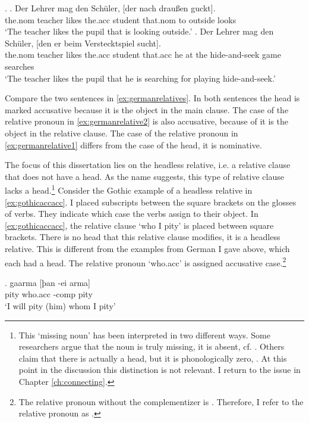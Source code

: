 \ex.\label{ex:germanrelatives}
\ag. Der Lehrer mag den Schüler, [der nach draußen guckt].\\
 the.\ac{nom} teacher likes the.\ac{acc} student that.\ac{nom} to outside looks\\
 `The teacher likes the pupil that is looking outside.'\label{ex:germanrelative1}
 \bg. Der Lehrer mag den Schüler, [den er beim Verstecktspiel sucht].\\
 the.\ac{nom} teacher likes the.\ac{acc} student that.\ac{acc} he {at the} {hide-and-seek game} searches\\
 `The teacher likes the pupil that he is searching for playing hide-and-seek.'\label{ex:germanrelative2}

Compare the two sentences in \ref{ex:germanrelatives}. In both sentences the head is marked accusative because it is the object in the main clause. The case of the relative pronoun in \ref{ex:germanrelative2} is also accusative, because of it is the object in the relative clause. The case of the relative pronoun in \ref{ex:germanrelative1} differs from the case of the head, it is nominative.


The focus of this dissertation lies on the headless relative, i.e. a relative clause that does not have a head. As the name suggests, this type of relative clause lacks a head.\footnote{
This `missing noun' has been interpreted in two different ways. Some researchers argue that the noun is truly missing, it is absent, cf. \citealt{vanriemsdijk2006}. Others claim that there is actually a head, but it is phonologically zero, \citealt{himmelreich2017}. At this point in the discussion this distinction is not relevant. I return to the issue in Chapter \ref{ch:connecting}.
}
Consider the Gothic example of a headless relative in \ref{ex:gothicaccacc}. I placed subscripts between the square brackets on the glosses of verbs. They indicate which case the verbs assign to their object.
In \ref{ex:gothicaccacc}, the relative clause  `who I pity' is placed between square brackets. There is no head that this relative clause modifies, it is a headless relative. This is different from the examples from German I gave above, which each had a head.
The relative pronoun  `who.\ac{acc}' is assigned accusative case.\footnote{
The relative pronoun without the complementizer  is . Therefore, I refer to the relative pronoun as .
}

\exg. gaarma [þan -ei arma]\\
 pity\scsub{[acc]} who.\ac{acc} -\ac{comp} pity\scsub{[acc]}\\
 `I will pity (him) whom I pity' \label{ex:gothicaccacc}

